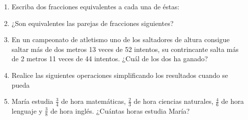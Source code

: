 \documentclass[letterpaper,11pt,twoside]{article}
\begin{document}
\begin{enumerate}
\begin{enumerate}
\end{enumerate}
\item Escriba dos fracciones equivalentes a cada una de éstas:
\begin{enumerate}
\end{enumerate}
\item ¿Son equivalentes las parejas de fracciones siguientes?
\begin{enumerate}
\end{enumerate}
\item En un campeonato de atletismo uno de los saltadores de altura consigue saltar más de dos metros 13 veces de 52 intentos, su contrincante salta m\'{a}s de 2 metros 11 veces de 44 intentos. ¿Cu\'{a}l de los dos ha ganado?
\item Realice las siguientes operaciones simplificando los resultados cuando se pueda
\begin{enumerate}
\end{enumerate}
\item María estudia $\frac{3}{4}$ de hora matemáticas, $\frac{2}{3}$ de hora ciencias naturales, $\frac{4}{6}$ de hora lenguaje y $\frac{3}{8}$ de hora inglés. ¿Cuántas horas estudia María?

\end{enumerate}
\end{document}
